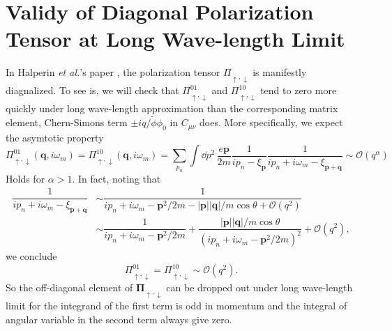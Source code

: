 \documentclass[bachelor,english,numbers]{ustcthesis}
\begin{document}
\chapter{Validy of Diagonal Polarization Tensor at Long Wave-length Limit}
	In Halperin {\it et al.}'s paper \cite{Halperin1995Theory}, the polarization tensor $\Pi_{\uparrow,\downarrow}$ is manifestly diagnalized. To see is, we will check that $\Pi^{01}_{\uparrow,\downarrow}$ and $\Pi^{10}_{\uparrow,\downarrow}$ tend to zero more quickly under long wave-length approximation than the corresponding matrix element, Chern-Simons term $\pm iq/\widetilde{\phi}\phi_0$ in $C_{\mu\nu}$ does. More specifically, we expect the asymtotic property
	\begin{equation}\label{B.1.1}
		\Pi^{01}_{\uparrow,\downarrow}(\bm{q},i\omega_m)=\Pi^{10}_{\uparrow,\downarrow}(\bm{q},i\omega_m)=\sum_{p_n}\int\dd p^2\,\dfrac{e\bm{p}}{2m}\dfrac{1}{ip_n-\xi_{\bm{p}}}\dfrac{1}{ip_n+i\omega_m-\xi_{\bm{p+q}}}\sim\mathcal{O}(q^\alpha)
	\end{equation}
	Holds for $\alpha>1$. In fact, noting that 
	\begin{align*}
		\dfrac{1}{ip_n+i\omega_m-\xi_{\bm{p+q}}}&\sim\dfrac{1}{ip_n+i\omega_m-\bm{p}^2/2m-|\bm{p}||\bm{q}|/m\cos\theta+\mathcal{O}(q^2)}\\
		&\sim\dfrac{1}{ip_n+i\omega_m-\bm{p}^2/2m}+\dfrac{|\bm{p}||\bm{q}|/m\cos\theta}{(ip_n+i\omega_m-\bm{p}^2/2m)^2}+\mathcal{O}(q^2),
	\end{align*}
	we conclude
	\begin{equation*}
		\Pi^{01}_{\uparrow,\downarrow}=\Pi^{10}_{\uparrow,\downarrow}\sim\mathcal{O}(q^2).
	\end{equation*}
	So the off-diagonal element of $\bm{\Pi}_{\uparrow,\downarrow}$ can be dropped out under long wave-length limit for the integrand of the first term is odd in momentum and the integral of angular variable in the second term always give zero.
\end{document}
